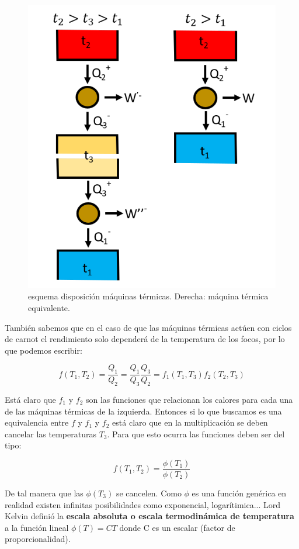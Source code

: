 \documentclass[12pt,a4paper]{article}
\begin{document}
\begin{figure}[h!] \centering
\includegraphics[scale=0.6]{Temperatura-absoluta-carnot.png}
\caption{esquema disposición máquinas térmicas. Derecha: máquina térmica equivalente.}
\label{fig:4-escala-termodinamica-temperaturas}
\end{figure}

También sabemos que en el caso de que las máquinas térmicas actúen con ciclos  de carnot el rendimiento solo dependerá de la temperatura de los focos, por lo que podemos escribir: 

$$ f(T_1,T_2) = \dfrac{Q_1}{Q_2} = \dfrac{Q_1}{Q_3} \dfrac{Q_3}{Q_2} = f_1(T_1,T_3) f_2 (T_2,T_3)  $$

Está claro que $f_1$ y $f_2$ son las funciones que relacionan los calores para cada una de las máquinas térmicas de la izquierda. Entonces si lo que buscamos es una equivalencia entre $f$ y $f_1  $ y $f_2$ está claro que en la multiplicación se deben cancelar las temperaturas $T_3$. Para que esto ocurra las funciones deben ser del tipo: 

$$ f(T_1,T_2) = \dfrac{\phi(T_1)}{\phi(T_2)} $$

De tal manera que las $\phi(T_3)$ se cancelen. Como $\phi$ es una función genérica en realidad existen infinitas posibilidades  como exponencial, logarítimica... Lord Kelvin definió la \textbf{escala absoluta o escala termodinámica de temperatura} a la función lineal $\phi (T) = CT$ donde C es un escalar (factor de proporcionalidad). \\
\end{document}

